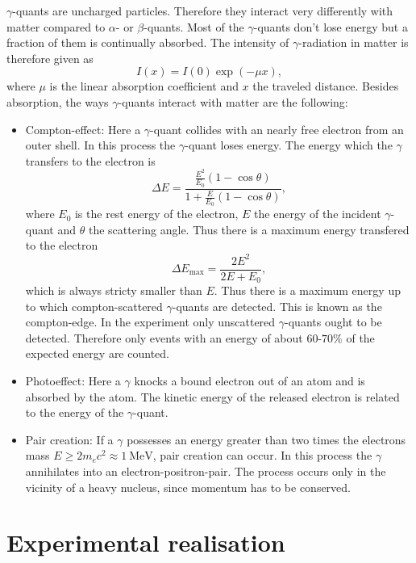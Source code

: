 $\gamma$-quants are uncharged particles. Therefore they interact very differently with matter compared to $\alpha$- or $\beta$-quants. Most of the $\gamma$-quants don't lose energy but a fraction of them is continually absorbed. The intensity of $\gamma$-radiation in matter is therefore given as
\begin{equation}
 I(x) = I(0) \exp\left(-\mu x\right),
\end{equation}
where $\mu$ is the linear absorption coefficient and $x$ the traveled distance. Besides absorption, the ways $\gamma$-quants interact with matter are the following:
\begin{itemize}
 \item Compton-effect: Here a $\gamma$-quant collides with an nearly free electron from an outer shell. In this process the $\gamma$-quant loses energy. The energy which the $\gamma$ transfers to the electron is \cite{BB}
	\begin{equation}
	  \Delta E = \frac{\frac{E^{2}}{E_{0}}\left(1-\cos\theta\right)}{1+\frac{E}{E_{0}}\left(1-\cos\theta\right)},
	\end{equation}
	where $E_{0}$ is the rest energy of the electron, $E$ the energy of the incident $\gamma$-quant and $\theta$ the scattering angle. Thus there is a maximum energy transfered to the electron
	\begin{equation}
	 \Delta E_{\textrm{max}} = \frac{2E^{2}}{2E+E_{0}},
	\end{equation}
	which is always stricty smaller than $E$. Thus there is a maximum energy up to which compton-scattered $\gamma$-quants are detected. This is known as the compton-edge. In the experiment only unscattered $\gamma$-quants ought to be detected. Therefore only events with an energy of about $60$-$70\%$ of the expected energy are counted.
 \item Photoeffect: Here a $\gamma$ knocks a bound electron out of an atom and is absorbed by the atom. The kinetic energy of the released electron is related to the energy of the $\gamma$-quant.
 \item Pair creation: If a $\gamma$ possesses an energy greater than two times the electrons mass $E\geq2m_{e}c^{2}\approx\SI{1}{\mega\electronvolt}$, pair creation can occur. In this process the $\gamma$ annihilates into an electron-positron-pair. The process occurs only in the vicinity of a heavy nucleus, since momentum has to be conserved.
\end{itemize}


\section{Experimental realisation}

